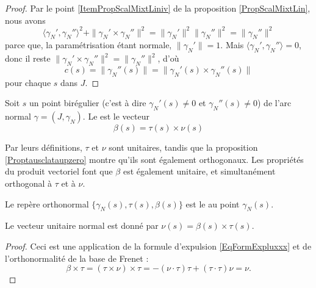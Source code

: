 \begin{proof}
    Par le point \ref{ItemPropScalMixtLiniv} de la proposition \ref{PropScalMixtLin}, nous avons
    \begin{equation}
        \langle \gamma_N', \gamma_N''\rangle^2 + \| \gamma_N'\times \gamma_N'' \|^2=\| \gamma_N' \|^2\| \gamma_N'' \|^2=\| \gamma_N'' \|^2
    \end{equation}
    parce que, la paramétrisation étant normale, $\| \gamma_N' \|=1$. Mais $\langle \gamma_N', \gamma_N''\rangle =0$, donc il reste $\| \gamma_N'\times \gamma_N'' \|^2=\| \gamma_N'' \|^2$, d'où
    \begin{equation}        \label{Eqcsnormgpgpps}
        c(s)=\| \gamma_N''(s) \|=\| \gamma_N'(s)\times \gamma_N''(s) \|
    \end{equation}
    pour chaque $s$ dans $J$.
\end{proof}

\begin{definition}
    Soit $s$ un point birégulier (c'est à dire $\gamma_N'(s)\neq 0$ et $\gamma_N''(s)\neq 0$) de l'arc normal $\gamma=(J,\gamma_N)$. Le  est le vecteur
    \begin{equation}
        \beta(s)=\tau(s)\times\nu(s)
    \end{equation}
\end{definition}

Par leurs définitions, $\tau$ et $\nu$ sont unitaires, tandis que la proposition \ref{Proptausclataupzero} montre qu'ils sont également orthogonaux. Les propriétés du produit vectoriel font que $\beta$ est également unitaire, et simultanément orthogonal à $\tau$ et à $\nu$.

\begin{definition}
    Le repère orthonormal $\{ \gamma_N(s),\tau(s),\beta(s) \}$ est le  au point $\gamma_N(s)$.
\end{definition}

\begin{lemma}
    Le  vecteur unitaire normal est donné par $\nu(s)=\beta(s)\times \tau(s)$.
\end{lemma}

\begin{proof}
    Ceci est une application de la formule d'expulsion \eqref{EqFormExpluxxx} et de l'orthonormalité de la base de Frenet :
    \begin{equation}
        \beta\times\tau=(\tau\times\nu)\times\tau=-(\nu\cdot\tau)\tau+(\tau\cdot\tau)\nu=\nu.
    \end{equation}
\end{proof}


